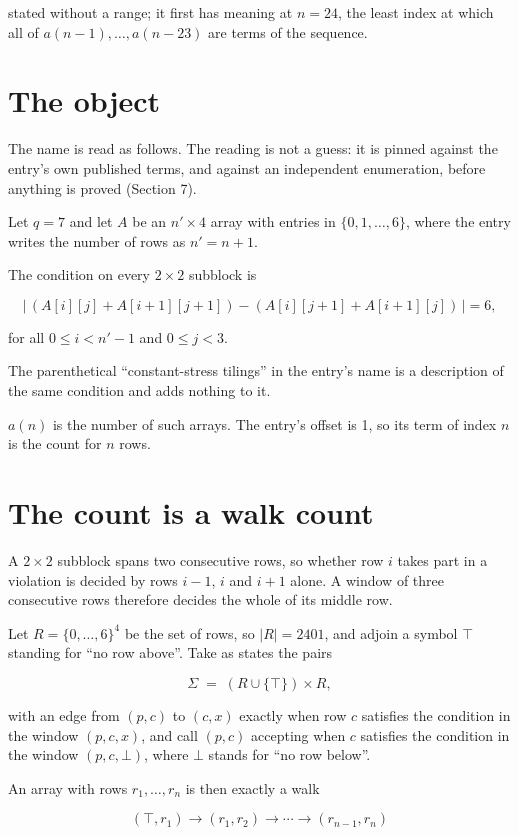 \documentclass[11pt]{article}
\theoremstyle{definition}
\begin{document}
stated without a range; it first has meaning at $n = 24$, the least index at which all of $a(n-1),\dots,a(n-23)$ are terms of the sequence.

\section{The object}

The name is read as follows. The reading is not a guess: it is pinned against the entry's own published terms, and against an independent enumeration, before anything is proved (Section 7).

Let $q = 7$ and let $A$ be an $n' \times 4$ array with entries in $\{0,1,\dots,6\}$, where the entry writes the number of rows as $n' = n + 1$.

The condition on every $2 \times 2$ subblock is

\[\bigl|\,(A[i][j] + A[i{+}1][j{+}1]) - (A[i][j{+}1] + A[i{+}1][j])\,\bigr| = 6,\]

for all $0 \le i < n'-1$ and $0 \le j < 3$.

The parenthetical ``constant-stress tilings'' in the entry's name is a description of the same condition and adds nothing to it.

$a(n)$ is the number of such arrays. The entry's offset is 1, so its term of index $n$ is the count for $n$ rows.

\section{The count is a walk count}

A $2 \times 2$ subblock spans two consecutive rows, so whether row $i$ takes part in a violation is decided by rows $i-1$, $i$ and $i+1$ alone. A window of three consecutive rows therefore decides the whole of its middle row.

Let $R = \{0,\dots,6\}^{4}$ be the set of rows, so $|R| = 2401$, and adjoin a symbol $\top$ standing for ``no row above''. Take as states the pairs

\[\Sigma \;=\; (R \cup \{\top\}) \times R,\]

with an edge from $(p,c)$ to $(c,x)$ exactly when row $c$ satisfies the condition in the window $(p,c,x)$, and call $(p,c)$ accepting when $c$ satisfies the condition in the window $(p,c,\bot)$, where $\bot$ stands for ``no row below''.

An array with rows $r_1,\dots,r_n$ is then exactly a walk

\[(\top,r_1) \to (r_1,r_2) \to \cdots \to (r_{n-1},r_n)\]
\end{document}
